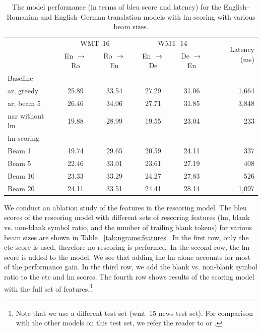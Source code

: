 \begin{table}
  \centering

  \begin{tabular}{lccccr}
    \toprule
    & \multicolumn{2}{c}{WMT~16}
    & \multicolumn{2}{c}{WMT~14}
    & \multirow{2}{*}{Latency (ms)} \\
    & En $\rightarrow$ Ro & Ro $\rightarrow$ En
    & En $\rightarrow$ De & De $\rightarrow$ En  & \\
    \midrule
    Baseline & & & & & \\
    \acs{ar}, greedy & 25.89 & 33.54 & 27.29 &  31.06 & 1,664 \\
    \acs{ar}, beam 5 & 26.46 & 34.06 & 27.71 & 31.85 & 3,848 \\
    \acs{nar} without \acs{lm} & 19.88 & 28.99 & 19.55 & 23.04 & 233 \\
    \addlinespace
    \acs{lm} scoring & & & & & \\
    Beam 1 & 19.74 & 29.65 & 20.59 & 24.11 &  337 \\
    Beam 5 & 22.46 & 33.01 & 23.61 & 27.19 & 408  \\
    Beam 10 & 23.33 & 33.29 & 24.27 & 27.83 & 526 \\
    Beam 20 & 24.11 & 33.51 & 24.41 & 28.14 & 1,097 \\
    \bottomrule
  \end{tabular}

  \caption{The model performance (in terms of \acs{bleu} score and latency) for
    the English--Romanian and English--German translation models with \acs{lm}
    scoring with various beam sizes.}%
  \label{tab:ngrams:bleu}
\end{table}

We conduct an ablation study of the features in the rescoring model. The
\acs{bleu} scores of the rescoring model with different sets of rescoring
features (\ac{lm}, blank vs. non-blank symbol ratio, and the number of trailing
blank tokens) for various beam sizes are shown in Table
~\ref{tab:ngrams:features}. In the first row, only the \ac{ctc} score is used,
therefore no rescoring is performed. In the second row, the \ac{lm} score is
added to the model. We see that adding the \ac{lm} alone accounts for most of
the performance gain. In the third row, we add the blank vs. non-blank symbol
ratio to the \ac{ctc} and \ac{lm} scores. The fourth row shows results of the
scoring model with the full set of features.\footnote{Note that we use a
  different test set (\ac{wmt}~15 news test set). For comparison with the other
  models on this test set, we refer the reader to \citet{kasner2020improving}
  or \citet{kasner2020incorporating}.}

